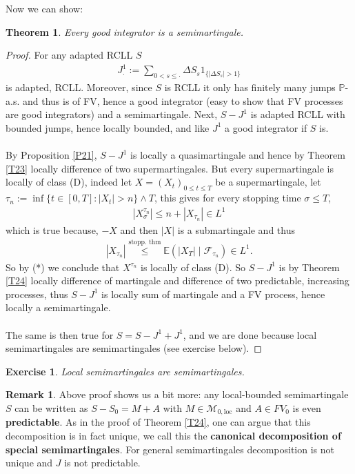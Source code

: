 \documentclass[12pt,a4paper, twoside]{article}
\newtheorem{thm}{Theorem}[section]
\newtheorem{exe}{Exercise}[section]
\theoremstyle{definition}
\newtheorem{rem}{Remark}[section]
\newcommand{\EE}{\mathbb{E}} %
\newcommand{\PP}{\mathbb{P}} %
\begin{document}
\newpage
Now we can show:
\begin{thm}\label{T25} Every good integrator is a semimartingale.
\end{thm}
\begin{proof}
For any adapted RCLL $S$ 
\begin{align*}
J_\cdot^1 := \sum_{0 < s \leq \cdot } \Delta S_s 1_{\{ | \Delta S_s| > 1 \}}
\end{align*}
is adapted, RCLL. Moreover, since $S$ is RCLL it only has finitely many jumps $\PP$-a.s. and thus is of FV, hence a good integrator (easy to show that FV processes are good integrators) and a semimartingale. Next, $S-J^1$ is adapted RCLL with bounded jumps, hence locally bounded, and like $J^1$ a good integrator if $S$ is. \\
\\
By Proposition \ref{P21}, $S-J^1$ is locally a quasimartingale and hence by Theorem \ref{T23} locally difference of two supermartingales. But every supermartingale is locally of class (D), indeed let $X=(X_t)_{0 \leq t \leq T}$ be a supermartingale, let $\tau_n := \inf \{ t \in [0,T]: |X_t| > n \} \wedge T$, this gives for every stopping time $\sigma \leq T$, 
\begin{align*}
|X_\sigma^{\tau_n}| \leq n + |X_{\tau_n}| \in L^1 \tag{*}
\end{align*}
which is true because, $-X$ and then $|X|$ is a submartingale and thus 
\begin{align*}
|X_{\tau_n}| \overset{\text{stopp. thm}}\leq \EE( |X_T| \mid \mathcal{F}_{\tau_n}) \in  L^1.
\end{align*}
So by (*) we conclude that $X^{\tau_n}$ is locally of class (D). So $S-J^1$ is by Theorem \ref{T24} locally difference of martingale and difference of two predictable,  increasing processes, thus $S-J^1$ is locally sum of martingale and a FV process, hence locally a semimartingale. 
\\\\
The same is then true for $S=S-J^1 + J^1$, and we are done because local semimartingales are semimartingales (see exercise below).
\end{proof}
\begin{exe}Local semimartingales are semimartingales.
\end{exe}
\begin{rem}Above proof shows us a bit more: any local-bounded semimartingale $S$ can be written as $S-S_0 = M +A$ with $M \in \mathcal{M}_{0, \text{loc}}$ and $A \in FV_0$ is even \textbf{predictable}. As in the proof of Theorem \ref{T24}, one can argue that this decomposition is in fact unique, we call this the \textbf{canonical decomposition of special semimartingales}. For general semimartingales decomposition is not unique and $J$ is not predictable. 
\end{rem}
\end{document}
